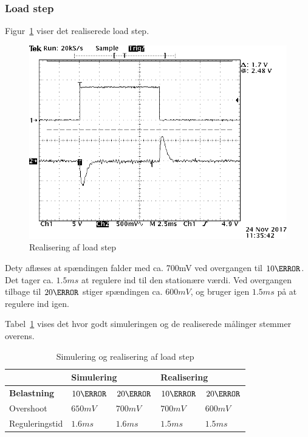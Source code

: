 \subsubsection{Load step}
Figur~\ref{fig:belastningsamlet} viser det realiserede load step.
\begin{figure}[H]
	\center
	\includegraphics[max width=0.7\linewidth]{../dokumentation/tex/2iteration/billeder/Realisering/belastningsamlet.png}
	\caption{Realisering af load step}
	\label{fig:belastningsamlet}
\end{figure}
Dety aflæses at spændingen falder med ca. 700mV ved overgangen til $10\ohm$. Det tager ca. $1.5ms$ at regulere ind til den stationære værdi. Ved overgangen tilbage til $20\ohm$ stiger spændingen ca. $600mV$, og bruger igen $1.5ms$ på at regulere ind igen.

Tabel~\ref{tab:Loadstep} vises det hvor godt simuleringen og de realiserede målinger stemmer overens.
\begin{table}[H] 			
	\centering
	\begin{tabularx}{\textwidth}{|X|l|l|l|l|}
		\hline
		& \multicolumn{2}{|l|}{\textbf{Simulering}} & \multicolumn{2}{|l|}{\textbf{Realisering}} \\ \hline
		\textbf{Belastning} & $10\ohm$ & $20\ohm$ & $10\ohm$ & $20\ohm$ \\ \hline
		Overshoot & $650mV$ & $700mV$ & $700mV$ & $600mV$  \\ \hline
		Reguleringstid & $1.6ms$ & $1.6ms$ & $1.5ms$ & $1.5ms$ \\ \hline
	\end{tabularx}
	\caption{Simulering og realisering af load step}
	\label{tab:Loadstep}
\end{table}

